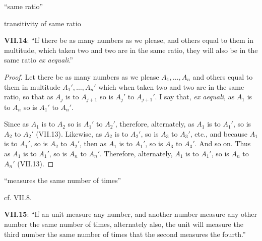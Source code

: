 \documentclass{article}
\begin{document}
``same ratio''

transitivity of same ratio

\textbf{VII.14}: ``If there be as many numbers as we please, and others equal to them in multitude, which taken two and two are in the same ratio, they will also be in the same ratio {\em ex aequali}.''

\begin{proof}
Let there be as many numbers as we please
$A_1,\ldots,A_n$ and others equal to them in multitude $A_1',\ldots,A_n'$ which when taken two and two are in the same ratio, so that
as $A_j$ is to $A_{j+1}$ so is $A_j'$ to $A_{j+1}'$. I say that, {\em ex aequali},
as $A_1$ is to $A_n$ so is $A_1'$ to $A_n'$.

Since as $A_1$ is to $A_2$ so is $A_1'$ to $A_2'$, therefore, alternately,
as $A_1$ is to $A_1'$, so is $A_2$ to $A_2'$ (VII.13).
Likewise, as $A_2$ is to $A_2'$, so is $A_3$ to $A_3'$, etc., and because $A_1$ is to $A_1'$, so is $A_2$ to $A_2'$,
then as $A_1$ is to $A_1'$, so is $A_3$ to $A_3'$. And so on.
Thus as $A_1$ is to $A_1'$, so is $A_n$ to $A_n'$.
Therefore, alternately, $A_1$ is to $A_1'$, so is $A_n$ to $A_n'$ (VII.13).
\end{proof}

``measures the same number of times''

cf. VII.8.

\textbf{VII.15}: ``If an unit measure any number, and another number measure any other number the same number of times, alternately also, the unit will measure the third number the same number of times that the second measures the fourth.''
\end{document}

